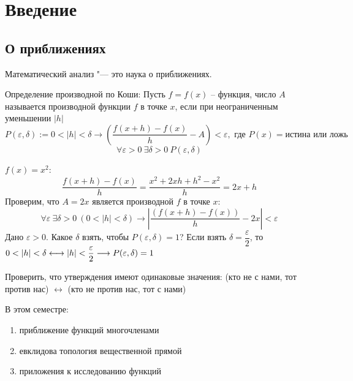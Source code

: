 \section{Введение}

\subsection{О приближениях}

    Математический анализ "--- это наука о приближениях.

    \begin{definition}
        Определение производной по Коши:
        Пусть $f = f(x)$ -- функция, число $A$ называется производной функции $f$ в
        точке $x$, если при неограниченным уменьшении $|h|$ \[
        P(\varepsilon, \delta) :=   0 < |h| < \delta \longrightarrow \left(\frac{f(x + h) - f(x)}{h} - A\right) < \varepsilon,
        \text{ где } P(x) = \text{истина или ложь} \]
        \[\forall \varepsilon > 0 \
        \exists \delta > 0 \ P(\varepsilon, \delta)
        \]
    \end{definition}
    \begin{example}
        $f(x) = x^2$:
        \begin{equation*}
            \frac{f(x + h) - f(x)}{h} = \frac{x^2 + 2xh + h^2 - x^2}{h} = 2x + h 
        \end{equation*}
        Проверим, что $A  = 2x$ является производной $f$ в точке $x$:
        \begin{equation*}
            \forall \varepsilon \ \exists \delta > 0 \ (0 < |h| < \delta) \rightarrow \left|\frac{(f(x + h )
            - f(x))}{h} - 2x\right| < \varepsilon
        \end{equation*}
        Дано $\varepsilon > 0$. Какое $\delta$ взять, чтобы $P(\varepsilon, \delta) = 1$?
        Если взять $\delta = \dfrac{\varepsilon}{2}$, то $0 < |h| < \delta \longleftrightarrow  |h|\hm{<} \dfrac{\varepsilon}{2}
        \longrightarrow P(\varepsilon, \delta) = 1$
    \end{example}
    \begin{exercise}
        Проверить, что утверждения имеют одинаковые значения: (кто не с нами, тот 
        против нас) $\longleftrightarrow$ (кто не против нас, тот с нами)
    \end{exercise}
    В этом семестре:
    \begin{enumerate}
        \item приближение функций многочленами
        \item евклидова топология вещественной прямой
        \item приложения к исследованию функций
    \end{enumerate}
